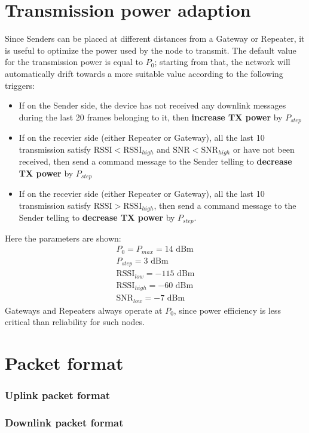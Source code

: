 \section{Transmission power adaption}
\label{sec: transmission power adaption}
Since Senders can be placed at different distances from a Gateway or Repeater, it is useful to optimize the power
used by the node to transmit. The default value for the transmission power is equal to $P_{0}$; starting from that, the
network will automatically drift towards a more suitable value according to the
following triggers:
\begin{itemize}
    \item If on the Sender side, the device has not received any downlink messages during
        the last 20 frames belonging to it, then \textbf{increase TX power} by $P_{step}$
    \item If on the recevier side (either Repeater or Gateway), all the last 10 transmission
        satisfy $\text{RSSI} < \text{RSSI}_{high}$ and $\text{SNR} < \text{SNR}_{high}$ or have not been received, then
        send a command message to the Sender telling to \textbf{decrease TX power} by $P_{step}$
    \item If on the recevier side (either Repeater or Gateway), all the last 10 transmission
        satisfy $\text{RSSI} > \text{RSSI}_{high}$, then send a command message to the Sender telling to
        \textbf{decrease TX power} by $P_{step}$.
\end{itemize}
Here the parameters are shown:
\begin{equation}
    \begin{array}{l}
        P_{0} = P_{max} = 14\text{ dBm} \\ P_{step} = 3\text{ dBm} \\ \text{RSSI}_{low} = -115\text{ dBm} \\ \text{RSSI}
        _{high} = -60\text{ dBm} \\ \text{SNR}_{low} = -7\text{ dBm}
    \end{array}
\end{equation}
Gateways and Repeaters always operate at $P_{0}$, since power efficiency is less critical than reliability for such nodes.


\section{Packet format}

\subsubsection{Uplink packet format}

\subsubsection{Downlink packet format}
